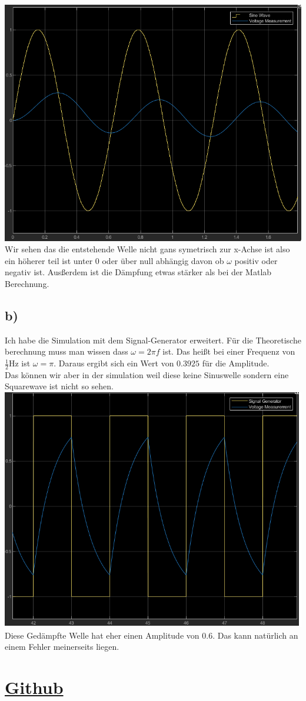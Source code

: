 \documentclass{scrartcl}
\begin{document}
\includegraphics[scale=0.4]{lowpass_sim_out33.png}\\

Wir sehen das die entstehende Welle nicht gans symetrisch zur x-Achse ist also ein höherer teil ist unter 0 oder über null abhängig davon ob $\omega$ positiv oder negativ ist. Ausßerdem ist die Dämpfung etwas stärker als bei der Matlab Berechnung.

\subsection*{b)}
Ich habe die Simulation mit dem Signal-Generator erweitert. Für die Theoretische berechnung muss man wissen dass $\omega = 2\pi f$ ist. Das heißt bei einer Frequenz von $\frac{1}{2}$Hz ist $\omega = \pi$. Daraus ergibt sich ein Wert von $0.3925$ für die Amplitude.\\
Das können wir aber in der simulation weil diese keine Sinuswelle sondern eine Squarewave ist nicht so sehen.\\
\includegraphics[scale=0.4]{lowpass_sim_out4.png}\\
Diese Gedämpfte Welle hat eher einen Amplitude von $0.6$. Das kann natürlich an einem Fehler meinerseits liegen.\\

\section*{\href{https://github.com/7hands/Angewandte-Modellierung-25-Colmant}{Github}}
\end{document}
